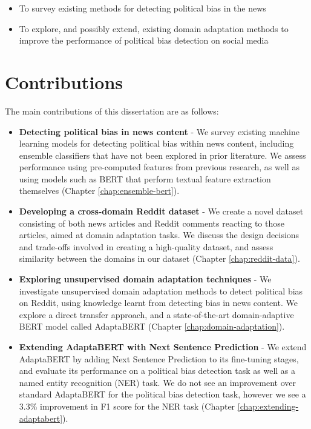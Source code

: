\begin{itemize}
    \item To survey existing methods for detecting political bias in the news
    \item To explore, and possibly extend, existing domain adaptation methods to improve the performance of political bias detection on social media
\end{itemize}

\section{Contributions}

The main contributions of this dissertation are as follows:

\begin{itemize}
    \item \textbf{Detecting political bias in news content} - We survey existing machine learning models for detecting political bias within news content, including ensemble classifiers that have not been explored in prior literature. We assess performance using pre-computed features from previous research, as well as using models such as BERT that perform textual feature extraction themselves (Chapter \ref{chap:ensemble-bert}).
    \item \textbf{Developing a cross-domain Reddit dataset} - We create a novel dataset consisting of both news articles and Reddit comments reacting to those articles, aimed at domain adaptation tasks. We discuss the design decisions and trade-offs involved in creating a high-quality dataset, and assess similarity between the domains in our dataset (Chapter \ref{chap:reddit-data}).
    \item \textbf{Exploring unsupervised domain adaptation techniques} - We investigate unsupervised domain adaptation methods to detect political bias on Reddit, using knowledge learnt from detecting bias in news content. We explore a direct transfer approach, and a state-of-the-art domain-adaptive BERT model called AdaptaBERT (Chapter \ref{chap:domain-adaptation}).
    \item \textbf{Extending AdaptaBERT with Next Sentence Prediction} - We extend AdaptaBERT by adding Next Sentence Prediction to its fine-tuning stages, and evaluate its performance on a political bias detection task as well as a named entity recognition (NER) task. We do not see an improvement over standard AdaptaBERT for the political bias detection task, however we see a 3.3\% improvement in F1 score for the NER task (Chapter \ref{chap:extending-adaptabert}).
\end{itemize}
